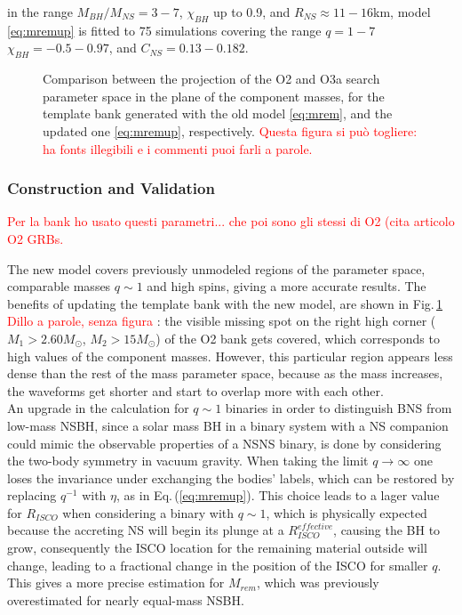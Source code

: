 \documentclass[binding=0.6cm, LaM]{sapthesis}
\newcommand{\fpg}[1]{\textcolor{red}{#1} }
\begin{document}
        in the range $M_{BH}/M_{NS}=3-7$, $\chi_{BH}$ up to 0.9, and $R_{NS} \approx 11-16$km,
        model \ref{eq:mremup} is fitted to 75 simulations covering the range $q = 1-7$ $\chi_{BH} =-0.5-0.97$,
        and $C_{NS} = 0.13-0.182$.
                \begin{figure}[H]
                        \noindent
                        \label{o3bankvso2bank}
                        \centering
                        \caption{Comparison between the projection of the O2 and O3a search parameter space in the plane of the component masses, for the template bank generated with the old model \ref{eq:mrem}, and the updated one \ref{eq:mremup}, respectively.  \fpg{Questa figura si pu\`o togliere: ha fonts illegibili e i commenti puoi farli a parole.}}
                        \label{fig:o3bankvso2bank}
                \end{figure}

\subsubsection{Construction and Validation}
\label{subsec:construction_and_validation}

\fpg{Per la bank ho usato questi parametri... che poi sono gli stessi di O2 (cita articolo O2 GRBs.}

        The new model covers previously unmodeled regions of the parameter space, comparable masses $q \sim 1$ and high spins,
        giving a more accurate  results.
	The benefits of updating the template bank with the new model, are shown in Fig.\,\ref{fig:o3bankvso2bank} \fpg{Dillo a parole, senza figura}:
        the visible missing spot on the right high corner ($M_1 >  2.60 M_\odot$, $M_2 > 15 M_\odot $) of the O2 bank gets covered,
        which corresponds to high values of the component masses. 
	However, this particular region appears less dense than the rest of the mass parameter space, 
	because as the mass increases, the waveforms get shorter and start to overlap more with each other. \\
        An upgrade in the calculation for $q \sim 1$ binaries in order to distinguish BNS from low-mass NSBH,
        since a solar mass BH in a binary system with a NS companion could mimic the observable properties of a NSNS binary,
        is done by considering the two-body symmetry in vacuum gravity.
        When taking the limit $q \rightarrow \infty$ one loses the invariance under exchanging the bodies' labels,
        which can be restored by replacing $q^{-1}$ with $\eta$, as in Eq.\,(\ref{eq:mremup}).
        This choice leads to a lager value for $R_{ISCO}$ when considering a binary with $q \sim 1$,
        which is physically expected because the accreting NS will begin its plunge at a $R_{ISCO}^{effective}$,
        causing the BH to grow, consequently the ISCO location for the remaining material outside will change,
        leading to a fractional change in the position of the ISCO for smaller $q$.
        This gives a more precise estimation for $M_{rem}$, which was previously overestimated for nearly equal-mass NSBH.
\end{document}
